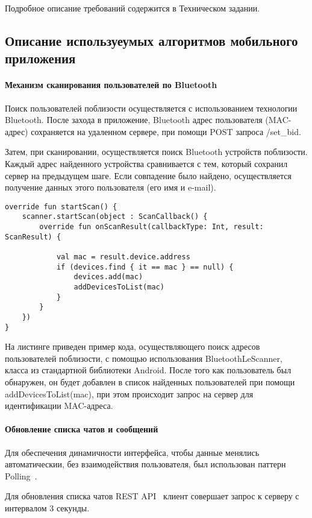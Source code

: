 \documentclass[explnote]{espd}
\begin{document}
Подробное описание требований содержится в Техническом задании.

\subsection{Описание используеумых алгоритмов мобильного приложения}
\paragraph{Механизм сканирования пользователей по Bluetooth}
Поиск пользователей поблизости осуществляется с использованием технологии Bluetooth. После захода в приложение, Bluetooth адрес пользователя (MAC-адрес) сохраняется на удаленном сервере, при помощи POST запроса /set\_bid.

Затем, при сканировании, осуществляется поиск Bluetooth устройств поблизости. Каждый адрес найденного устройства сравнивается с тем, который сохранил сервер на предыдущем шаге. Если совпадение было найдено, осуществляется получение данных этого пользователя (его имя и e-mail).

\begin{verbatim}
override fun startScan() {
    scanner.startScan(object : ScanCallback() {
        override fun onScanResult(callbackType: Int, result: ScanResult) {

            val mac = result.device.address
            if (devices.find { it == mac } == null) {
                devices.add(mac)
                addDevicesToList(mac)
            }
        }
    })
}
\end{verbatim}

На листинге приведен пример кода, осуществляющего поиск адресов пользователей поблизости, с помощью использования BluetoothLeScanner, класса из стандартной библиотеки Android. После того как пользователь был обнаружен, он будет добавлен в список найденных пользователей при помощи addDevicesToList(mac), при этом происходит запрос на сервер для идентификации MAC-адреса.

\paragraph{Обновление списка чатов и сообщений}
Для обеспечения динамичности интерфейса, чтобы данные менялись автоматическии, без взаимодействия пользователя, был использован паттерн Polling~\cite{polling}.

Для обновления списка чатов REST API~\cite{rest} клиент совершает запрос к серверу с интервалом 3 секунды.
\end{document}
